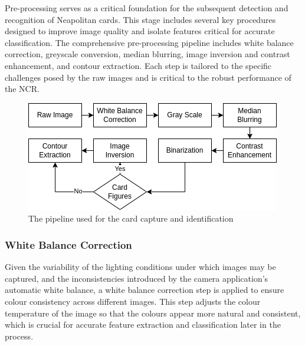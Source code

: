 \documentclass[twocolumn, a4paper,10pt]{article}
\begin{document}
Pre-processing serves as a critical foundation for the subsequent detection and recognition of Neapolitan cards. This stage includes several key procedures designed to improve image quality and isolate features critical for accurate classification. The comprehensive pre-processing pipeline includes white balance correction, greyscale conversion, median blurring, image inversion and contrast enhancement, and contour extraction. Each step is tailored to the specific challenges posed by the raw images and is critical to the robust performance of the NCR.
 
\begin{figure}[H]
  \centering
\includegraphics[width=.4\textwidth]{img/Preprocessing-Pipeline.png}
\caption*{The pipeline used for the card capture and identification} 
\end{figure}

\subsubsection*{White Balance Correction}
Given the variability of the lighting conditions under which images may be captured, and the inconsistencies introduced by the camera application's automatic white balance, a white balance correction step is applied to ensure colour consistency across different images. This step adjusts the colour temperature of the image so that the colours appear more natural and consistent, which is crucial for accurate feature extraction and classification later in the process.
\end{document}
